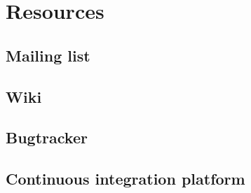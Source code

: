 \chapter[Resources]{Resources}

\section{Mailing list}

\section{Wiki}

\section{Bugtracker}

\section{Continuous integration platform}
